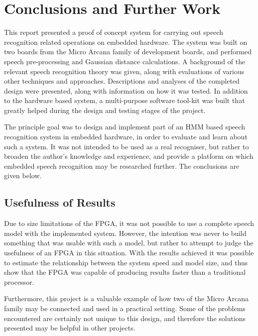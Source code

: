 \chapter{Conclusions and Further Work} %
\label{cha:conclusions_and_future_work}


This report presented a proof of concept system for carrying out speech recognition related operations on embedded hardware.  The system was built on two boards from the Micro Arcana family of development boards, and performed speech pre-processing and Gaussian distance calculations.  A background of the relevant speech recognition theory was given, along with evaluations of various other techniques and approaches.  Descriptions and analyses of the completed design were presented, along with information on how it was tested.  In addition to the hardware based system, a multi-purpose software tool-kit was built that greatly helped during the design and testing stages of the project.

The principle goal was to design and implement part of an HMM based speech recognition system in embedded hardware, in order to evaluate and learn about such a system.  It was not intended to be used as a real recogniser, but rather to broaden the author's knowledge and experience, and provide a platform on which embedded speech recognition may be researched further.  The conclusions are given below.


\section{Usefulness of Results} %
\label{sec:usefulness}
	Due to size limitations of the FPGA, it was not possible to use a complete speech model with the implemented system.  However, the intention was never to build something that was usable with such a model, but rather to attempt to judge the usefulness of an FPGA in this situation.  With the results achieved it was possible to estimate the relationship between the system speed and model size, and thus show that the FPGA was capable of producing results faster than a traditional processor.

	Furthermore, this project is a valuable example of how two of the Micro Arcana family may be connected and used in a practical setting.  Some of the problems encountered are certainly not unique to this design, and therefore the solutions presented may be helpful in other projects.

